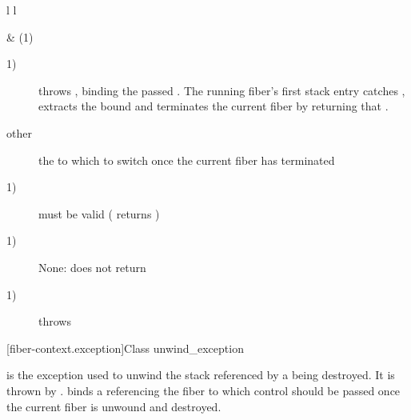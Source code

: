 \begin{tabular}{ l l }
    \midrule

     & (1)\\

    \midrule
\end{tabular}

\begin{description}
    \item[1)] throws \unwindex, binding the passed \fiber. The running fiber's
              first stack entry catches \unwindex, extracts the bound \fiber
              and terminates the current fiber by returning that \fiber.
\end{description}

\begin{description}
    \item[other] the \fiber to which to switch once the current fiber has terminated
\end{description}

\begin{description}
    \item[1)]  must be valid ( returns )
\end{description}

\begin{description}
    \item[1)] None: \unwindfib does not return
\end{description}

\begin{description}
    \item[1)] throws \unwindex
\end{description}


[fiber-context.exception]{Class unwind\_exception}

is the exception used to unwind the stack referenced by a \fiber being destroyed.
It is thrown by \unwindfib. \unwindex binds a \fiber referencing the fiber to
which control should be passed once the current fiber is unwound and destroyed.
